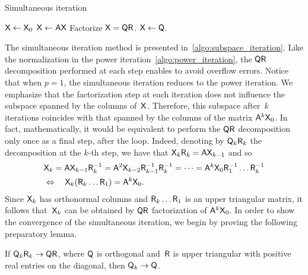 \begin{algorithm}[ht!]
\caption{Simultaneous iteration}%
\label{algo:subspace_iteration}%
\begin{algorithmic}
\State $\mathsf X \gets \mathsf X_0$
    \State $\mathsf X \gets \mathsf A \mathsf X$
    \State Factorize $\mathsf X = \mathsf Q \mathsf R$.
    \State $\mathsf X \gets \mathsf Q$.
\EndFor
\end{algorithmic}
\end{algorithm}
The simultaneous iteration method is presented in~\cref{algo:subspace_iteration}.
Like the normalization in the power iteration~\cref{algo:power_iteration},
the $\mathsf Q \mathsf R$ decomposition performed at each step enables to avoid overflow errors.
Notice that when $p = 1$,
the simultaneous iteration reduces to the power iteration.
We emphasize that
the factorization step at each iteration does not influence the subspace spanned by the columns of~$\mathsf X$.
Therefore, this subspace after~$k$ iterations
coincides with that spanned by the columns of the matrix $\mathsf A^k \mathsf X_0$.
In fact, mathematically, it would be equivalent to perform the $\mathsf Q \mathsf R$ decomposition only once as a final step,
after the  loop.
Indeed, denoting by $\mathsf Q_k \mathsf R_k$ the decomposition at the $k$-th step,
we have that $\mathsf X_k \mathsf R_k = \mathsf A \mathsf X_{k-1}$ and so
\begin{align*}
    &\mathsf X_k = \mathsf A \mathsf X_{k-1} \mathsf R_k^{-1} = \mathsf A^2 \mathsf X_{k-2} \mathsf R_{k-1}^{-1} \mathsf R_k^{-1} = \dotsb
    = \mathsf A^k \mathsf X_0 \mathsf R_1^{-1} \dotsc \mathsf R_k^{-1} \\
    &\Leftrightarrow \quad \mathsf X_k (\mathsf R_k \dotsc \mathsf R_1) = \mathsf A^k \mathsf X_0.
\end{align*}
Since $\mathsf X_k$ has orthonormal columns and $\mathsf R_k \dotsc \mathsf R_1$ is an upper triangular matrix,
it follows that~$\mathsf X_k$ can be obtained by $\mathsf Q \mathsf R$ factorization of $\mathsf A^k \mathsf X_0$.
In order to show the convergence of the simultaneous iteration,
we begin by proving the following preparatory lemma.
\begin{lemma}
    \label{lemma:continuity_qr}
    If $\mathsf Q_k \mathsf R_k \to \mathsf Q \mathsf R$,
    where $\mathsf Q$ is orthogonal and~$\mathsf R$ is upper triangular with positive real entries on the diagonal,
    then $\mathsf Q_k \to \mathsf Q$.
\end{lemma}

